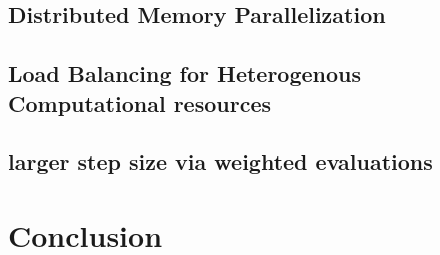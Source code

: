 \subsection{Distributed Memory Parallelization}

\subsection{Load Balancing for Heterogenous Computational resources}
\subsection{larger step size via weighted evaluations}
\section{Conclusion}
